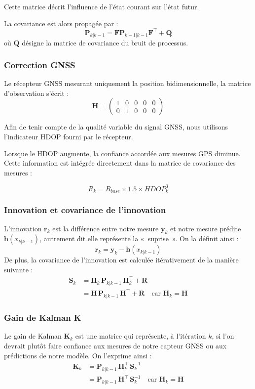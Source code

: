 \documentclass{article}
\begin{document}
Cette matrice décrit l'influence de l'état courant sur l'état futur.

La covariance est alors propagée par :
\[
\mathbf{P}_{k|k-1} = \mathbf{F} \mathbf{P}_{k-1|k-1} \mathbf{F}^\top + \mathbf{Q}
\]
où $\mathbf{Q}$ désigne la matrice de covariance du bruit de processus.

\subsubsection{Correction GNSS}

Le récepteur GNSS mesurant uniquement la position bidimensionnelle, la matrice d'observation s'écrit :
\[
\mathbf{H} = \begin{pmatrix} 1 & 0 & 0 & 0 & 0 \\ 0 & 1 & 0 & 0 & 0 \end{pmatrix}
\]

Afin de tenir compte de la qualité variable du signal GNSS, nous utilisons l'indicateur HDOP fourni par le récepteur.

Lorsque le HDOP augmente, la confiance accordée aux mesures GPS diminue. Cette information est intégrée directement dans la matrice de covariance des mesures :

\[
R_k = R_{base}\times1.5\times HDOP_k^3
\]

\subsubsection{Innovation et covariance de l'innovation}
L'innovation $\mathbf r_k$ est la différence entre notre mesure $\mathbf y_k$ et notre mesure prédite $\mathbf h(x_{k|k-1})$, autrement dit elle représente la «~suprise~». On la définit ainsi :
\[
\mathbf r_k = \mathbf y_k - \mathbf h(x_{k|k-1})
\]
De plus, la covariance de l'innovation est calculée itérativement de la manière suivante :
\[
\begin{aligned}
    \mathbf S_k &= \mathbf H_k \, \mathbf P_{k|k-1} \, \mathbf H_k^\top + \mathbf R \\
                &= \mathbf H \, \mathbf P_{k|k-1} \, \mathbf H^\top + \mathbf R
    \quad \text{car } \mathbf H_k = \mathbf H
\end{aligned}
\]

\subsubsection{Gain de Kalman K}
Le gain de Kalman $\mathbf K_k$ est une matrice qui représente, à l'itération $k$, si l'on devrait plutôt faire confiance aux mesures de notre capteur GNSS ou aux prédictions de notre modèle. On l'exprime ainsi :
\[
\begin{aligned}
    \mathbf K_k &= \mathbf P_{k|k-1} \, \mathbf H_k^\top \, \mathbf S_k^{-1} \\
                &= \mathbf P_{k|k-1} \, \mathbf H^\top \, \mathbf S_k^{-1}
    \quad \text{car } \mathbf H_k = \mathbf H
\end{aligned}
\]
\end{document}
